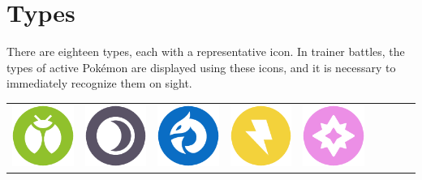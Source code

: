 \chapter{Types}
\label{chap:types}
There are eighteen types, each with a representative icon.
In trainer battles, the types of active Pokémon are displayed
 using these icons, and it is necessary to immediately recognize
 them on sight.

\begin{table}[h!]
  \begin{center}
  \begin{tabular}{c c c c c c c c c}
  \includegraphics[scale=.25]{images/bug.png} &
  \includegraphics[scale=.25]{images/dark.png} &
  \includegraphics[scale=.25]{images/dragon.png} &
  \includegraphics[scale=.25]{images/electric.png} &
  \includegraphics[scale=.25]{images/fairy.png} &

\end{tabular}
\end{center}
\end{table}
